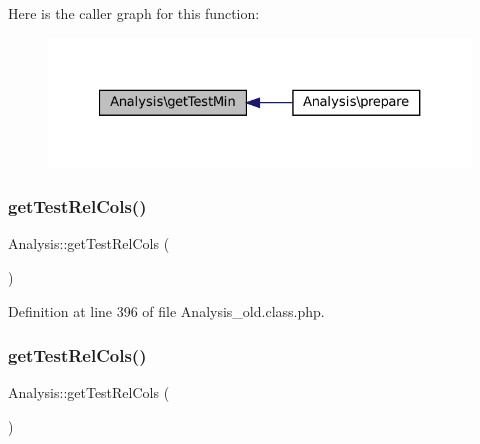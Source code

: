 Here is the caller graph for this function\+:\nopagebreak
\begin{figure}[H]
\begin{center}
\leavevmode
\includegraphics[width=327pt]{class_analysis_ae60332a39d4ae552bf601a683a219f09_icgraph}
\end{center}
\end{figure}
\mbox{\label{class_analysis_a2a26317d11c76f0100c16807b3d5cd4e}} 
\subsubsection{\texorpdfstring{get\+Test\+Rel\+Cols()}{getTestRelCols()}\hspace{0.1cm}{\footnotesize\ttfamily [1/2]}}
{\footnotesize\ttfamily Analysis\+::get\+Test\+Rel\+Cols (\begin{DoxyParamCaption}{ }\end{DoxyParamCaption})\hspace{0.3cm}{\ttfamily [protected]}}



Definition at line 396 of file Analysis\+\_\+old.\+class.\+php.

\mbox{\label{class_analysis_a2a26317d11c76f0100c16807b3d5cd4e}} 
\subsubsection{\texorpdfstring{get\+Test\+Rel\+Cols()}{getTestRelCols()}\hspace{0.1cm}{\footnotesize\ttfamily [2/2]}}
{\footnotesize\ttfamily Analysis\+::get\+Test\+Rel\+Cols (\begin{DoxyParamCaption}{ }\end{DoxyParamCaption})\hspace{0.3cm}{\ttfamily [protected]}}

